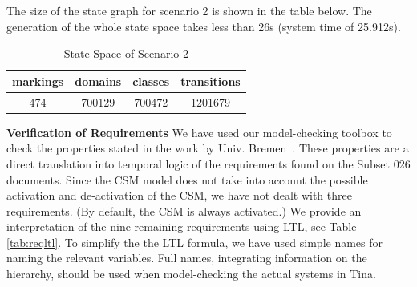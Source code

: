 The size of the state graph for scenario 2 is shown in the table
below. The generation of the whole state space takes less than 26s
(system time of 25.912s).


\begin{table}[ht!]
\caption{State Space of Scenario 2}
\footnotesize
\begin{center}
  \begin{tabular}{|c|c|c|c|}
    \hline
    markings & domains & classes & transitions \\
    \hline
    474 & 700129	 & 700472 & 1201679 \\ 
    \hline
  \end{tabular}
\end{center}
\end{table}

\textbf{Verification of Requirements} 
We have used our model-checking toolbox to check the properties stated
in the work by Univ. Bremen~\cite{csmwp4}. These properties are a
direct translation into temporal logic of the requirements found on
the Subset 026 documents. Since the CSM model does not take into
account the possible activation and de-activation of the CSM, we have
not dealt with three requirements. (By default, the CSM is always
activated.) We provide an interpretation of the nine remaining
requirements using LTL, see Table \ref{tab:reqltl}. To simplify the
the LTL formula, we have used simple names for naming the relevant
variables. Full names, integrating information on the hierarchy,
should be used when model-checking the actual systems in Tina.


